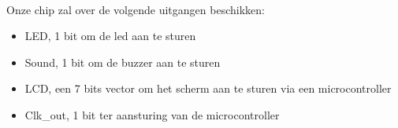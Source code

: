 \noindent
\\
Onze chip zal over de volgende uitgangen beschikken:
\begin{itemize}[nolistsep]
\item	LED, 1 bit om de led aan te sturen
\item	Sound, 1 bit om de buzzer aan te sturen
\item	LCD, een 7 bits vector om het scherm aan te sturen via een microcontroller
\item  Clk\_out, 1 bit ter aansturing van de microcontroller
\end{itemize}